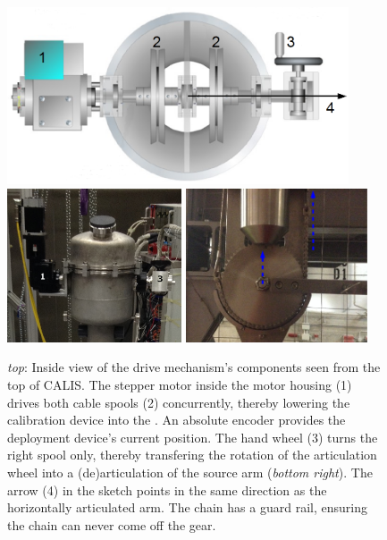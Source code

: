 \begin{figure}[htbp]
 \centering
\includegraphics[width=0.9\textwidth]{Figures/gearDrawing_withNumbers}
  \includegraphics[width=0.46\textwidth]{Figures/CALIS_head.png}
  \includegraphics[width=0.48\textwidth]{Figures/gearArticulated.png}
  \caption{\textit{top}: Inside view of the drive mechanism's components seen from the top of CALIS. The stepper motor inside the motor housing (1) drives both cable spools (2) concurrently, thereby lowering the calibration device into the \lsv. An absolute encoder provides the deployment device's current position. The hand wheel (3) turns the right spool only, thereby transfering the rotation of the articulation wheel into a (de)articulation of the source arm (\textit{bottom right}). The arrow (4) in the sketch points in the same direction as the horizontally articulated arm. The chain has a guard rail, ensuring the chain can never come off the gear.}
  \label{fig:sourceArmRotation}
\end{figure} 

